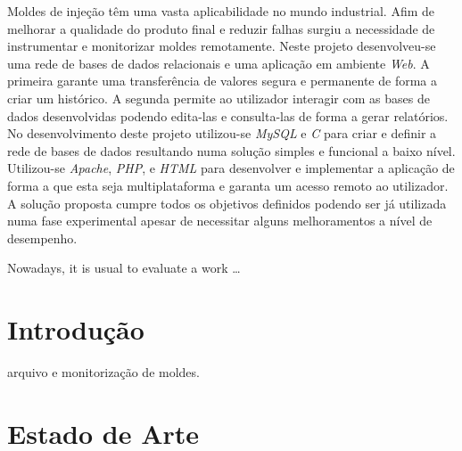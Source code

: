 \documentclass[11pt,twoside,a4paper]{report}
\begin{document}
\TitlePage
  \vspace*{55mm}
       {Moldes de injeção têm uma vasta aplicabilidade no mundo industrial. Afim de melhorar a qualidade do produto final e reduzir falhas surgiu a necessidade de instrumentar e monitorizar moldes remotamente. Neste projeto desenvolveu-se uma rede de bases de dados relacionais e uma aplicação em ambiente \textit{Web}. A primeira garante uma transferência de valores segura e permanente de forma a criar um histórico. A segunda permite ao utilizador interagir com as bases de dados desenvolvidas podendo edita-las e consulta-las de forma a gerar relatórios.\\
       	No desenvolvimento deste projeto utilizou-se \textit{MySQL} e \textit{C} para criar e definir a rede de bases de dados resultando numa solução simples e funcional a baixo nível. Utilizou-se \textit{Apache}, \textit{PHP}, e \textit{HTML} para desenvolver e implementar a aplicação de forma a que esta seja multiplataforma e garanta um acesso remoto ao utilizador.\\
       	A solução proposta cumpre todos os objetivos definidos podendo ser já utilizada numa fase experimental apesar de necessitar alguns melhoramentos a nível de desempenho.
       	}
  \TEXT{}
       {}
\EndTitlePage
\titlepage\ \endtitlepage %

\TitlePage
  \vspace*{55mm}
       {Nowadays, it is usual to evaluate a work \ldots}
\EndTitlePage
\titlepage\ \endtitlepage %


%
%

\tableofcontents

\cleardoublepage
\listoffigures

\cleardoublepage
\listoftables



\cleardoublepage
{}
\chapter{Introdução}
arquivo e monitorização de moldes.


\cleardoublepage
\chapter{Estado de Arte}
\end{document}
